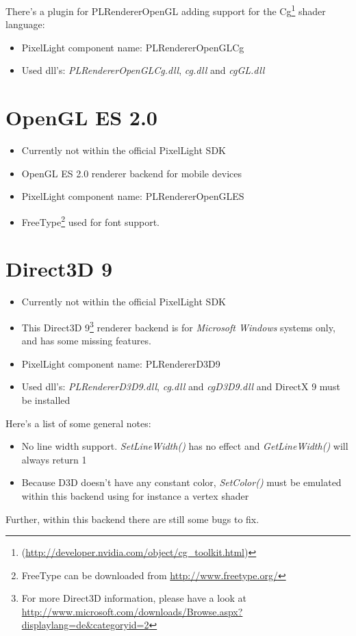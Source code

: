 There's a plugin for PLRendererOpenGL adding support for the Cg\footnote{(\url{http://developer.nvidia.com/object/cg_toolkit.html})} shader language:
\begin{itemize}
\item PixelLight component name: PLRendererOpenGLCg
\item Used dll's: \emph{PLRendererOpenGLCg.dll}, \emph{cg.dll} and \emph{cgGL.dll}
\end{itemize}




\section{OpenGL ES 2.0}
\begin{itemize}
\item Currently not within the official PixelLight SDK
\item OpenGL ES 2.0 renderer backend for mobile devices
\item PixelLight component name: PLRendererOpenGLES
\item FreeType\footnote{FreeType can be downloaded from \url{http://www.freetype.org/}} used for font support.
\end{itemize}




\section{Direct3D 9}
\begin{itemize}
\item Currently not within the official PixelLight SDK
\item This Direct3D 9\footnote{For more Direct3D information, please have a look at \url{http://www.microsoft.com/downloads/Browse.aspx?displaylang=de&categoryid=2}} renderer backend is for \emph{Microsoft Windows} systems only, and has some missing features.
\item PixelLight component name: PLRendererD3D9
\item Used dll's: \emph{PLRendererD3D9.dll}, \emph{cg.dll} and \emph{cgD3D9.dll} and DirectX 9 must be installed
\end{itemize}

Here's a list of some general notes:
\begin{itemize}
\item No line width support. \emph{SetLineWidth()} has no effect and \emph{GetLineWidth()} will always return 1
\item Because D3D doesn't have any constant color, \emph{SetColor()} must be emulated within this backend using for instance a vertex shader
\end{itemize}
Further, within this backend there are still some bugs to fix.




